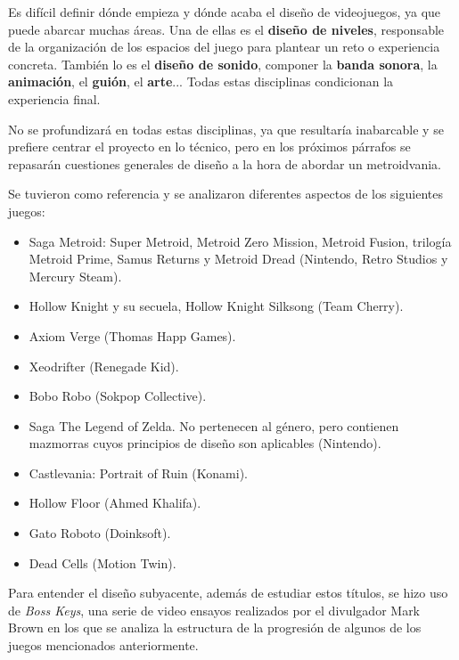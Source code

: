Es difícil definir dónde empieza y dónde acaba el diseño de videojuegos, ya que puede abarcar muchas áreas. Una de ellas es el \textbf{diseño de niveles}, responsable de la organización de los espacios del juego para plantear un reto o experiencia concreta. También lo es el \textbf{diseño de sonido}, componer la \textbf{banda sonora}, la \textbf{animación}, el \textbf{guión}, el \textbf{arte}... Todas estas disciplinas condicionan la experiencia final. 

No se profundizará en todas estas disciplinas, ya que resultaría inabarcable y se prefiere centrar el proyecto en lo técnico, pero en los próximos párrafos se repasarán cuestiones generales de diseño a la hora de abordar un metroidvania.

Se tuvieron como referencia y se analizaron diferentes aspectos de los siguientes juegos:

\begin{itemize}
    \item Saga Metroid: Super Metroid, Metroid Zero Mission, Metroid Fusion, trilogía Metroid Prime, Samus Returns y Metroid Dread (Nintendo, Retro Studios y Mercury Steam).
    \item Hollow Knight y su secuela, Hollow Knight Silksong (Team Cherry).
    \item Axiom Verge (Thomas Happ Games).
    \item Xeodrifter (Renegade Kid).
    \item Bobo Robo (Sokpop Collective).
    \item Saga The Legend of Zelda. No pertenecen al género, pero contienen mazmorras cuyos principios de diseño son aplicables (Nintendo).
    \item Castlevania: Portrait of Ruin (Konami).
    \item Hollow Floor (Ahmed Khalifa).
    \item Gato Roboto (Doinksoft).
    \item Dead Cells (Motion Twin).
\end{itemize}

Para entender el diseño subyacente, además de estudiar estos títulos, se hizo uso de \textit{Boss Keys}\cite{boss-keys}, una serie de video ensayos realizados por el divulgador Mark Brown en los que se analiza la estructura de la progresión de algunos de los juegos mencionados anteriormente.


